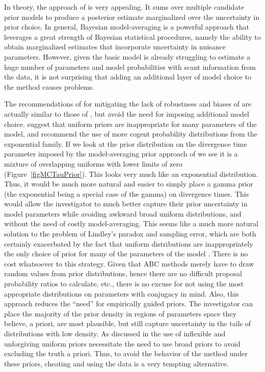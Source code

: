 \documentclass[letterpaper,12pt]{article}
\begin{document}
\begin{linenumbers}
In theory, the approach of \citet{Hickerson2013} is very appealing.  It sums
over multiple candidate prior models to produce a posterior estimate
marginalized over the uncertainty in prior choice.
In general, Bayesian model-averaging is a powerful approach that leverages a
great strength of Bayesian statistical procedures, namely the ability to
obtain marginalized estimates that incorporate uncertainty in nuisance
parameters.
However, given the basic \msb model is already struggling to estimate
a huge number of parameters and model probabilities with scant information
from the data, it is not surprising that adding an additional layer of
model choice to the method causes problems.

The recommendations of \citet{Oaks2012} for mitigating the lack of robustness
and biases of \msb are actually similar to those of \citet{Hickerson2013},
but avoid the need for imposing additional model choice.
\citet{Oaks2012} suggest that uniform priors are inappropriate for many
parameters of the \msb model, and recommend the use of more cogent probability
distributions from the exponential family.
If we look at the prior distribution on the divergence time parameter \divt{}
imposed by the model-averaging prior approach of \citet{Hickerson2013} we see
it is a mixture of overlapping uniforms with lower limits of zero
(Figure~\ref{figMCTauPrior}).
This looks very much like an exponential distribution.
Thus, it would be much more natural and easier to simply place a gamma prior
(the exponential being a special case of the gamma) on divergence times.
This would allow the investigator to much better capture their prior
uncertainty in model parameters while avoiding awkward broad uniform
distributions, and without the need of costly model-averaging.
This seems like a much more natural solution to the problem of Lindley's
paradox and sampling error, which are both certainly exacerbated by the fact
that uniform distributions are inappropriately the only choice of prior for
many of the parameters of the \msb model \citep[\divt{}, \ancestralTheta{},
, , \bottleTime{},
, , \locusMutationRateScalar,
\migrationRate{}, \recombinationRate;][]{Oaks2012}.
There is no cost whatsoever to this strategy.
Given that ABC methods merely have to draw random values from prior
distributions, hence there are no difficult proposal probability ratios to
calculate, etc., there is no excuse for not using the most appropriate
distributions on parameters with conjugacy in mind.
Also, this approach reduces the ``need'' for empirically guided priors.
The investigator can place the majority of the prior density in regions
of parameters space they believe, a priori, are most plausible, but still
capture uncertainty in the tails of distributions with low density.
As discussed in \citet{Oaks2012} the use of inflexible and unforgiving uniform
priors necessitate the need to use broad priors to avoid excluding the truth a
priori.
Thus, to avoid the behavior of the method under these priors, cheating
and using the data is a very tempting alternative.




\end{linenumbers}
\end{document}
